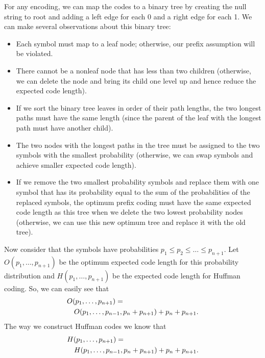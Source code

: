  For any encoding, we can map the codes to a binary tree by
creating the null string to root and adding a left edge for each 0 and
a right edge for each 1. We can make several observations about this binary tree:
\begin{itemize}
\itemsep 1pt
\item Each symbol must map to a leaf node; otherwise, our prefix
  assumption will be violated.
\item There cannot be a nonleaf node that has less than two children
  (otherwise, we can delete the node and bring its child one level up
  and hence reduce the expected code length).
\item If we sort the binary tree leaves in order of their path lengths,
  the two longest paths must have the same length (since the
  parent of the leaf with the longest path must have another child).
\item The two nodes with the longest paths in the tree must be assigned to
  the two symbols with the smallest probability (otherwise, we can swap
  symbols and achieve smaller expected code length).
\item If we remove the two smallest probability symbols and replace them
  with one symbol that has its probability equal to the sum of the probabilities of the replaced symbols, the optimum prefix
  coding must have the same expected code length as this tree when we
  delete the two lowest probability nodes (otherwise, we can use this
  new optimum tree and replace it with the old tree).
\end{itemize}


Now consider that the symbols have probabilities $p_1 \le p_2 \le
\ldots \le p_{n+1}$.  
Let $O(p_1,\ldots, p_{n+1})$ be the optimum
expected code length for this probability distribution and
$H(p_1,\ldots, p_{n+1})$ be the expected code length for Huffman coding. So, we can
easily see that
{
\begin{eqnarray*}
\lefteqn{O(p_1,\ldots, p_{n+1}) =} \\
& & O(p_1,\ldots, p_{n-1}, p_n + p_{n+1}) + p_n + p_{n+1} .
\end{eqnarray*}
}
The way we construct Huffman codes we know that 
{
\begin{eqnarray*}
\lefteqn{ H(p_1,\ldots, p_{n+1}) = } \\
& & H(p_1,\ldots, p_{n-1}, p_n + p_{n+1}) +
p_n + p_{n+1} . 
\end{eqnarray*}
}

